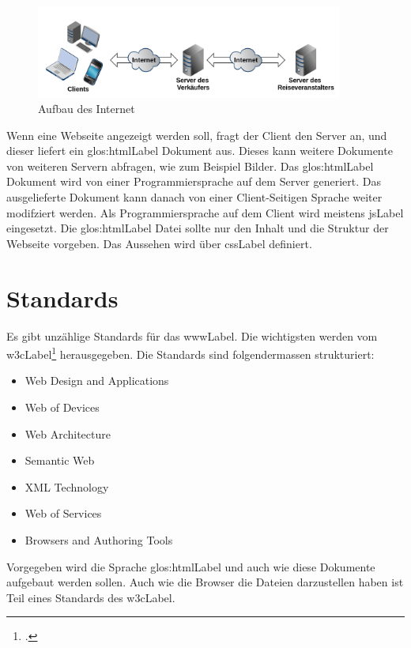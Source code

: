 \begin{figure}[H]
  \centering
  \includegraphics[width=0.9\textwidth]{images/aufbau-internet.png}
  \caption{Aufbau des Internet}
  \label{fig:einfuehrung:aufbau-des-internets}
\end{figure}

Wenn eine Webseite angezeigt werden soll, fragt der Client den Server an, und dieser liefert ein \Gls{glos:htmlLabel} Dokument aus. Dieses kann weitere Dokumente von weiteren Servern abfragen, wie zum Beispiel Bilder.
Das \Gls{glos:htmlLabel} Dokument wird von einer Programmiersprache auf dem Server generiert. Das ausgelieferte Dokument kann danach von einer Client-Seitigen Sprache weiter modifziert werden. Als Programmiersprache auf dem Client wird meistens \gls{jsLabel} eingesetzt. Die \Gls{glos:htmlLabel} Datei sollte nur den Inhalt und die Struktur der Webseite vorgeben. Das Aussehen wird über \gls{cssLabel} definiert.



\section{Standards}
Es gibt unzählige Standards für das \gls{wwwLabel}. Die wichtigsten werden vom \gls{w3cLabel}\footcite{World_Wide_Web_Consortium_2015-05-30} herausgegeben.
Die Standards sind folgendermassen strukturiert:
\begin{itemize}
\item Web Design and Applications
\item Web of Devices
\item Web Architecture
\item Semantic Web
\item XML Technology
\item Web of Services
\item Browsers and Authoring Tools
\end{itemize}
Vorgegeben wird die Sprache \Gls{glos:htmlLabel} und auch wie diese Dokumente aufgebaut werden sollen. Auch wie die Browser die Dateien darzustellen haben ist Teil eines Standards des \gls{w3cLabel}.


